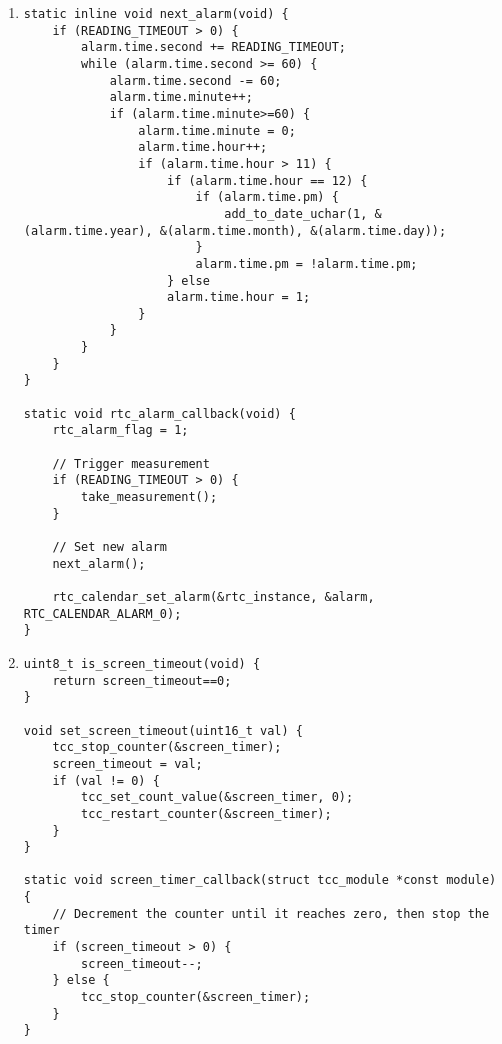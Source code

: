 \begin{enumerate}[label=\textbf{S.\arabic*},ref=S.\arabic*{ of Appendix A}]
\item \label{rtc_alarm_callback}
\begin{adjustwidth}{-2em}{0pt}
\singlespacing
\nl
\begin{lstlisting}
static inline void next_alarm(void) {
    if (READING_TIMEOUT > 0) {
        alarm.time.second += READING_TIMEOUT;
        while (alarm.time.second >= 60) {
            alarm.time.second -= 60;
            alarm.time.minute++;
            if (alarm.time.minute>=60) {
                alarm.time.minute = 0;
                alarm.time.hour++;
                if (alarm.time.hour > 11) {
                    if (alarm.time.hour == 12) {
                        if (alarm.time.pm) {
                            add_to_date_uchar(1, &(alarm.time.year), &(alarm.time.month), &(alarm.time.day));
                        }
                        alarm.time.pm = !alarm.time.pm;
                    } else
                    alarm.time.hour = 1;
                }
            }
        }
    }
}

static void rtc_alarm_callback(void) {
    rtc_alarm_flag = 1;

    // Trigger measurement
    if (READING_TIMEOUT > 0) {
        take_measurement();
    }

    // Set new alarm
    next_alarm();

    rtc_calendar_set_alarm(&rtc_instance, &alarm, RTC_CALENDAR_ALARM_0);
}
\end{lstlisting}
\end{adjustwidth}
\doublespacing

\item \label{screen_timer_callback}
\begin{adjustwidth}{-2em}{0pt}
\singlespacing
\nl
\begin{lstlisting}
uint8_t is_screen_timeout(void) {
    return screen_timeout==0;
}

void set_screen_timeout(uint16_t val) {
    tcc_stop_counter(&screen_timer);
    screen_timeout = val;
    if (val != 0) {
        tcc_set_count_value(&screen_timer, 0);
        tcc_restart_counter(&screen_timer);
    }
}

static void screen_timer_callback(struct tcc_module *const module) {
    // Decrement the counter until it reaches zero, then stop the timer
    if (screen_timeout > 0) {
        screen_timeout--;
    } else {
        tcc_stop_counter(&screen_timer);
    }
}
\end{lstlisting}
\end{adjustwidth}
\doublespacing


\end{enumerate}
